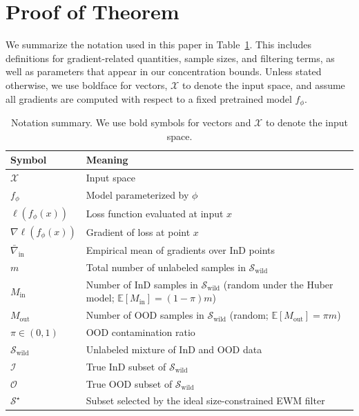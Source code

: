 \documentclass[10pt]{article} %
\theoremstyle{plain}
\theoremstyle{definition}
\begin{document}
\section{Proof of Theorem} \label{appendix:proof}
We summarize the notation used in this paper in Table~\ref{tab:notation}. This includes definitions for gradient-related quantities, sample sizes, and filtering terms, as well as parameters that appear in our concentration bounds. Unless stated otherwise, we use boldface for vectors, \( \mathcal{X} \) to denote the input space, and assume all gradients are computed with respect to a fixed pretrained model \( f_\phi \).


\begin{table}[h]
\centering
\renewcommand{\arraystretch}{1.0}
\caption{Notation summary. We use bold symbols for vectors and \( \mathcal{X} \) to denote the input space.}
\label{tab:notation}
\begin{tabularx}{\textwidth}{@{} p{} X @{}}
\toprule
\textbf{Symbol} & \textbf{Meaning} \\
\midrule
\( \mathcal{X} \) & Input space \\
\( f_\phi \) & Model parameterized by \( \phi \) \\
\( \ell(f_\phi(x)) \) & Loss function evaluated at input \( x \) \\
\( \nabla \ell(f_\phi(x)) \) & Gradient of loss at point \( x \) \\
\( \bar{\nabla}_{\mathrm{in}} \) & Empirical mean of gradients over InD points \\
\midrule
\( m \) & Total number of unlabeled samples in \( \mathcal{S}_{\mathrm{wild}} \) \\
\( M_{\mathrm{in}} \) & Number of InD samples in \( \mathcal{S}_{\mathrm{wild}} \) (random under the Huber model; \( \mathbb{E}[M_{\mathrm{in}}]=(1-\pi)m \)) \\
\( M_{\mathrm{out}} \) & Number of OOD samples in \( \mathcal{S}_{\mathrm{wild}} \) (random; \( \mathbb{E}[M_{\mathrm{out}}]=\pi m \)) \\
\( \pi \in (0,1) \) & OOD contamination ratio \\
\midrule
\( \mathcal{S}_{\mathrm{wild}} \) & Unlabeled mixture of InD and OOD data \\
\( \mathcal{I} \) & True InD subset of \( \mathcal{S}_{\mathrm{wild}} \) \\
\( \mathcal{O} \) & True OOD subset of \( \mathcal{S}_{\mathrm{wild}} \) \\
\( \mathcal{S}^\star \) & Subset selected by the ideal size-constrained EWM filter \\

\end{tabularx}
\end{table}
\end{document}
